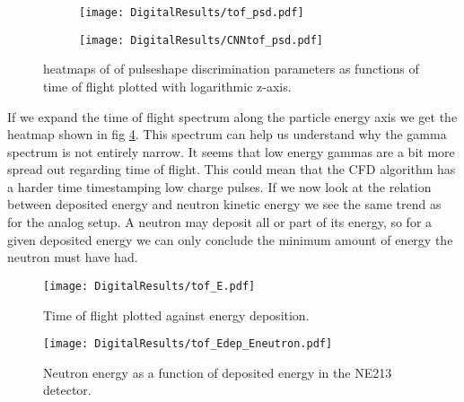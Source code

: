 \documentclass[main.tex]{subfiles}
\begin{document}
\begin{figure}
    \centering
    \begin{subfigure}[ht]{\textwidth}
        \texttt{[image: DigitalResults/tof\_psd.pdf]}
        \caption{}
        \label{fig:tof_digi_cc}
    \end{subfigure}
	\begin{subfigure}[ht]{\textwidth}
        \texttt{[image: DigitalResults/CNNtof\_psd.pdf]}
        \caption{}
        \label{fig:tof_digi_cnn}
    \end{subfigure}
    \caption{heatmaps of of pulseshape discrimination parameters as functions of time of flight plotted with logarithmic z-axis.}
    \label{fig:tof_cc_tof_cnn}
\end{figure}

If we expand the time of flight spectrum along the particle energy axis we get the heatmap shown in fig \ref{fig:tof_E_d}. This spectrum can help us understand why the gamma spectrum is not entirely narrow. It seems that low energy gammas are a bit more spread out regarding time of flight. This could mean that the CFD algorithm has a harder time timestamping low charge pulses.
If we now look at the relation between deposited energy and neutron kinetic energy we see the same trend as for the analog setup. A neutron may deposit all or part of its energy, so for a given deposited energy we can only conclude the minimum amount of energy the neutron must have had.


\begin{figure}[ht]
    \centering
        \texttt{[image: DigitalResults/tof\_E.pdf]}
        \caption{Time of flight plotted against energy deposition.}
    \label{fig:tof_E_d} 
\end{figure}

\begin{figure}[ht]
    \centering
        \texttt{[image: DigitalResults/tof\_Edep\_Eneutron.pdf]}
        \caption{Neutron energy as a function of deposited energy in the NE213 detector.}
    \label{fig:tof_Edep_Eneutron_d} 
\end{figure}
\end{document}

